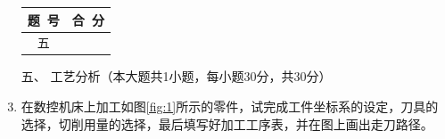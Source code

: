 \documentclass[12pt,twocolumn,landscape,UTF8,twoside]{ctexart}
\begin{document}
\begin{spacing}{1.3}
\begin{enumerate} [1、]
%
%
%
%
%
~~~
\vspace{1mm} 
\item[\heiti \begin{minipage}{\@}
	\begin{tabular}{|c|c|}\hline 题~号 & 合~分\\ \hline	五& \\\hline\end{tabular}
\end{minipage} ]{}

\item[\heiti 五、] {\heiti 工艺分析（本大题共1小题，每小题30分，共30分）}


\item 在数控机床上加工如图\ref{fig:1}所示的零件，试完成工件坐标系的设定，刀具的选择，切削用量的选择，最后填写好加工工序表，并在图上画出走刀路径。


\end{enumerate}
\end{spacing}
\end{document}
